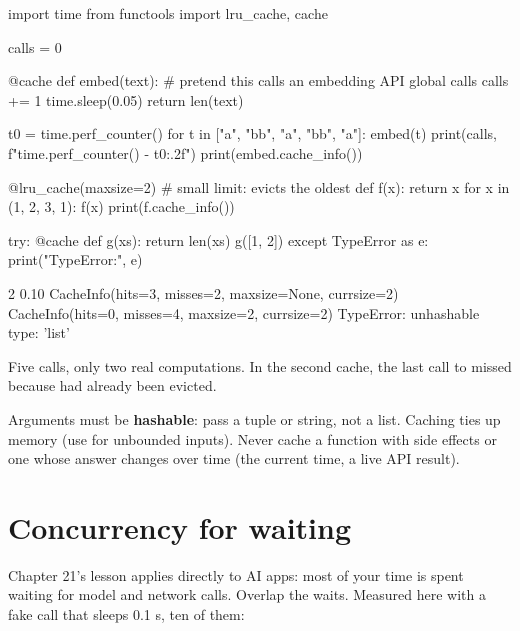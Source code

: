 \begin{pycode}
import time
from functools import lru_cache, cache

calls = 0

@cache
def embed(text):                 # pretend this calls an embedding API
    global calls
    calls += 1
    time.sleep(0.05)
    return len(text)

t0 = time.perf_counter()
for t in ["a", "bb", "a", "bb", "a"]:
    embed(t)
print(calls, f"{time.perf_counter() - t0:.2f}")
print(embed.cache_info())

@lru_cache(maxsize=2)            # small limit: evicts the oldest
def f(x): return x
for x in (1, 2, 3, 1):
    f(x)
print(f.cache_info())

try:
    @cache
    def g(xs): return len(xs)
    g([1, 2])
except TypeError as e:
    print("TypeError:", e)
\end{pycode}
\begin{rawcode}
2 0.10
CacheInfo(hits=3, misses=2, maxsize=None, currsize=2)
CacheInfo(hits=0, misses=4, maxsize=2, currsize=2)
TypeError: unhashable type: 'list'
\end{rawcode}

Five calls, only two real computations. In the second cache, the last call to  missed
because  had already been evicted.

\begin{trap}
Arguments must be \textbf{hashable}: pass a tuple or string, not a list. Caching ties up memory
(use  for unbounded inputs). Never cache a function with side effects
or one whose answer changes over time (the current time, a live API result).
\end{trap}

\section{Concurrency for waiting}

Chapter 21's lesson applies directly to AI apps: most of your time is spent waiting for model and
network calls. Overlap the waits. Measured here with a fake call that sleeps 0.1 s, ten of them:

